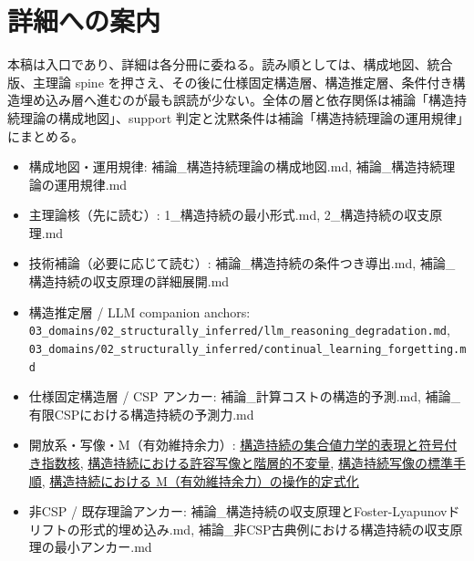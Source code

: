 \documentclass[12pt,a4paper]{article}
\begin{document}
\section{詳細への案内}\label{ux8a73ux7d30ux3078ux306eux6848ux5185}

本稿は入口であり、詳細は各分冊に委ねる。読み順としては、構成地図、統合版、主理論 spine を押さえ、その後に仕様固定構造層、構造推定層、条件付き構造埋め込み層へ進むのが最も誤読が少ない。全体の層と依存関係は補論「構造持続理論の構成地図」、support 判定と沈黙条件は補論「構造持続理論の運用規律」にまとめる。

\begin{itemize}
\tightlist
\item
  構成地図・運用規律: 補論\_構造持続理論の構成地図.md, 補論\_構造持続理論の運用規律.md
\item
  主理論核（先に読む）: 1\_構造持続の最小形式.md, 2\_構造持続の収支原理.md
\item
  技術補論（必要に応じて読む）: 補論\_構造持続の条件つき導出.md, 補論\_構造持続の収支原理の詳細展開.md
\item
  構造推定層 / LLM companion anchors: \texttt{03\_domains/02\_structurally\_inferred/llm\_reasoning\_degradation.md}, \texttt{03\_domains/02\_structurally\_inferred/continual\_learning\_forgetting.md}
\item
  仕様固定構造層 / CSP アンカー: 補論\_計算コストの構造的予測.md, 補論\_有限CSPにおける構造持続の予測力.md
\item
  開放系・写像・M（有効維持余力）: \href{../02_foundations/23_set_valued_dynamics.md}{構造持続の集合値力学的表現と符号付き指数核}, \href{../02_foundations/22_admissible_maps.md}{構造持続における許容写像と階層的不変量}, \href{../04_operations/50_standard_mapping_procedure.md}{構造持続写像の標準手順}, \href{../04_operations/52_resource_M.md}{構造持続における M（有効維持余力）の操作的定式化}
\item
  非CSP / 既存理論アンカー: 補論\_構造持続の収支原理とFoster-Lyapunovドリフトの形式的埋め込み.md, 補論\_非CSP古典例における構造持続の収支原理の最小アンカー.md
\end{itemize}
\end{document}
